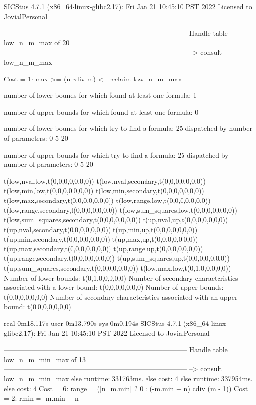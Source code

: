 SICStus 4.7.1 (x86_64-linux-glibc2.17): Fri Jan 21 10:45:10 PST 2022
Licensed to JovialPersonal


--------------------------------------------------------------------------------
Handle table low_n_m_max of 20
--------------------------------------------------------------------------------
--> consult low_n_m_max

Cost =  1:  max >= (n cdiv m)
<-- reclaim low_n_m_max

number of lower bounds for which found at least one formula: 1

number of upper bounds for which found at least one formula: 0

number of lower bounds for which try to find a formula: 25
dispatched by number of parameters: 0  5  20

number of upper bounds for which try to find a formula: 25
dispatched by number of parameters: 0  5  20

t(low,nval,low,t(0,0,0,0,0,0,0))
t(low,nval,secondary,t(0,0,0,0,0,0,0))
t(low,min,low,t(0,0,0,0,0,0,0))
t(low,min,secondary,t(0,0,0,0,0,0,0))
t(low,max,secondary,t(0,0,0,0,0,0,0))
t(low,range,low,t(0,0,0,0,0,0,0))
t(low,range,secondary,t(0,0,0,0,0,0,0))
t(low,sum_squares,low,t(0,0,0,0,0,0,0))
t(low,sum_squares,secondary,t(0,0,0,0,0,0,0))
t(up,nval,up,t(0,0,0,0,0,0,0))
t(up,nval,secondary,t(0,0,0,0,0,0,0))
t(up,min,up,t(0,0,0,0,0,0,0))
t(up,min,secondary,t(0,0,0,0,0,0,0))
t(up,max,up,t(0,0,0,0,0,0,0))
t(up,max,secondary,t(0,0,0,0,0,0,0))
t(up,range,up,t(0,0,0,0,0,0,0))
t(up,range,secondary,t(0,0,0,0,0,0,0))
t(up,sum_squares,up,t(0,0,0,0,0,0,0))
t(up,sum_squares,secondary,t(0,0,0,0,0,0,0))
t(low,max,low,t(0,1,0,0,0,0,0))
Number of lower bounds:                                             t(0,1,0,0,0,0,0)
Number of secondary characteristics associated with a lower bound:  t(0,0,0,0,0,0,0)
Number of upper bounds:                                             t(0,0,0,0,0,0,0)
Number of secondary characteristics associated with an upper bound: t(0,0,0,0,0,0,0)

real	0m18.117s
user	0m13.790s
sys	0m0.194s
SICStus 4.7.1 (x86_64-linux-glibc2.17): Fri Jan 21 10:45:10 PST 2022
Licensed to JovialPersonal


--------------------------------------------------------------------------------
Handle table low_n_m_min_max of 13
--------------------------------------------------------------------------------
--> consult low_n_m_min_max
else runtime: 331763ms. else cost: 4
else runtime: 337954ms. else cost: 4
Cost =  6:  range = ([n=m.min] ? 0 : (-m.min + n) cdiv (m - 1)) %
Cost =  2:  rmin  = -m.min + n
----------

